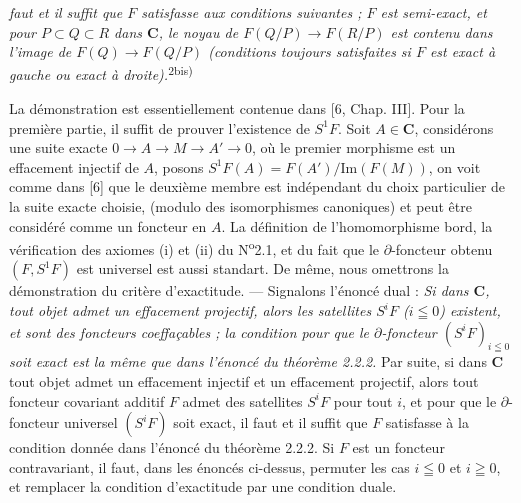 
\noindent\textit{faut et il suffit que $F$ satisfasse aux conditions suivantes ;
$F$ est semi-exact, et pour $P\subset Q\subset R$ dans $\mathbf{C}$, le noyau de
$F(Q/P)\to F(R/P)$ est contenu dans l'image de
$F(Q)\to F(Q/P)$ (conditions toujours satisfaites si $F$ est
exact à gauche ou exact à droite).}\textsuperscript{2bis)}

La démonstration est essentiellement contenue dans [6, Chap. III]. Pour la
première partie, il suffit de prouver l'existence de $S^1F$. Soit $A\in \mathbf{C}$,
considérons une suite exacte
$0\to A\to M\to A'\to0$, où
le premier morphisme est un effacement injectif de $A$, posons
$S^1F(A)=F(A')/\mathrm{Im}(F(M))$, on voit comme dans [6] que le deuxième
membre est indépendant du choix particulier de la suite exacte choisie,
(modulo des isomorphismes canoniques) et peut être considéré comme un foncteur
en $A$. La définition de l'homomorphisme bord, la vérification des axiomes (i)
et (ii) du N\textsuperscript{o}2.1, et du fait que le $\partial$-foncteur obtenu
$(F,S^1F)$ est universel est aussi standart. De même, nous omettrons la
démonstration du critère d'exactitude.
--- Signalons l'énoncé dual : \textit{Si dans $\mathbf{C}$, tout objet admet un
effacement projectif, alors les satellites $S^iF$ ($i\leqq0$) existent, et
sont des foncteurs coeffaçables ; la condition pour que le $\partial$-foncteur
$(S^iF)_{i\leqq0}$ soit exact est la même que dans l'énoncé du théorème \textup{2.2.2}.}
Par suite, si dans $\mathbf{C}$ tout objet admet un effacement injectif et un effacement
projectif, alors tout foncteur covariant additif $F$ admet des satellites
$S^iF$ pour tout $i$, et pour que le $\partial$-foncteur universel $(S^iF)$
soit exact, il faut et il suffit que $F$ satisfasse à la condition donnée dans
l'énoncé du théorème 2.2.2. Si $F$ est un foncteur contravariant, il faut, dans
les énoncés ci-dessus, permuter les cas $i\leqq0$ et $i\geqq0$, et remplacer la
condition d'exactitude par une condition duale.

